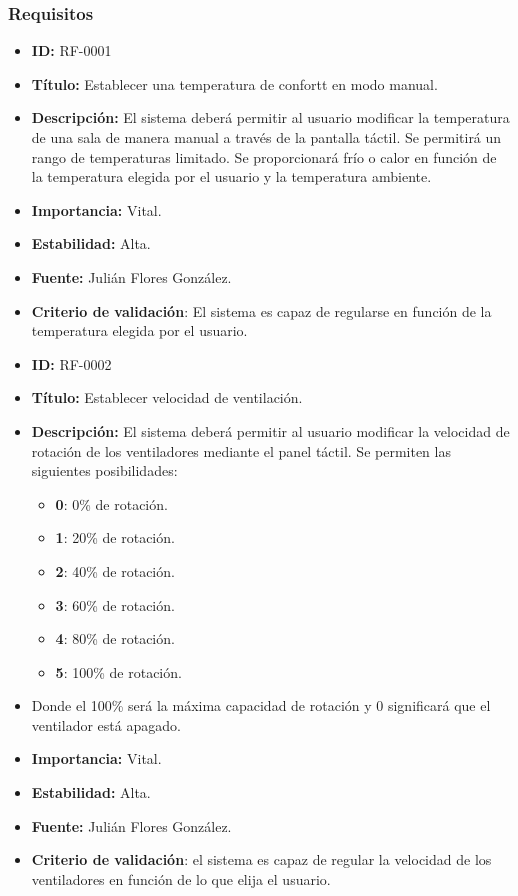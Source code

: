 \subsubsection{Requisitos}
\begin{itemize}
\item \textbf{ID:} RF-0001
\item \textbf{Título:} Establecer una temperatura de confortt en modo manual.
\item \textbf{Descripción:} El sistema deberá permitir al usuario modificar la temperatura de una sala de manera manual a través de la pantalla táctil. Se permitirá un rango de temperaturas limitado. Se proporcionará frío o calor en función de la temperatura elegida por el usuario y la temperatura ambiente.
\item \textbf{Importancia:} Vital.
\item \textbf{Estabilidad:} Alta.
\item \textbf{Fuente:} Julián Flores González.
\item \textbf{Criterio de validación}: El sistema es capaz de regularse en función de la temperatura elegida por el usuario.
\end{itemize}
\begin{itemize}
\item \textbf{ID:} RF-0002
\item \textbf{Título:} Establecer velocidad de ventilación.
\item \textbf{Descripción:} El sistema deberá permitir al usuario modificar la velocidad de rotación de los ventiladores mediante el panel táctil. Se permiten las siguientes posibilidades:
\begin{itemize}
\item \textbf{0}: 0\% de rotación. 
\item \textbf{1}: 20\% de rotación. 
\item \textbf{2}: 40\% de rotación. 
\item \textbf{3}: 60\% de rotación. 
\item \textbf{4}: 80\% de rotación. 
\item \textbf{5}: 100\% de rotación. 
\end{itemize}
\item[] Donde el 100\% será la máxima capacidad de rotación y 0 significará que el ventilador está apagado.
\item \textbf{Importancia:} Vital.
\item \textbf{Estabilidad:} Alta.
\item \textbf{Fuente:} Julián Flores González.
\item \textbf{Criterio de validación}: el sistema es capaz de regular la velocidad de los ventiladores en función de lo que elija el usuario.
\end{itemize}

